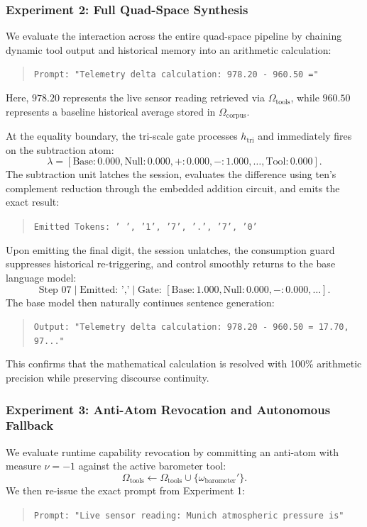 \documentclass[preprint,12pt]{elsarticle}
\begin{document}
\subsubsection{Experiment 2: Full Quad-Space Synthesis}
We evaluate the interaction across the entire quad-space pipeline by chaining dynamic tool output and historical memory into an arithmetic calculation:
\begin{quote}
\texttt{Prompt: "Telemetry delta calculation: 978.20 - 960.50 ="}
\end{quote}
Here, $978.20$ represents the live sensor reading retrieved via $\Omega_{\mathrm{tools}}$, while $960.50$ represents a baseline historical average stored in $\Omega_{\mathrm{corpus}}$.

At the equality boundary, the tri-scale gate processes $h_{\mathrm{tri}}$ and immediately fires on the subtraction atom:
\begin{equation}
\lambda = [\text{Base}: 0.000, \text{Null}: 0.000, +: 0.000, -: 1.000, \dots, \text{Tool}: 0.000].
\end{equation}
The subtraction unit latches the session, evaluates the difference using ten's complement reduction through the embedded addition circuit, and emits the exact result:
\begin{quote}
\texttt{Emitted Tokens: ' ', '1', '7', '.', '7', '0'}
\end{quote}
Upon emitting the final digit, the session unlatches, the consumption guard suppresses historical re-triggering, and control smoothly returns to the base language model:
\begin{equation}
\text{Step 07} \mid \text{Emitted: } \texttt{','} \mid \text{Gate: } [\text{Base}: 1.000, \text{Null}: 0.000, -: 0.000, \dots].
\end{equation}
The base model then naturally continues sentence generation:
\begin{quote}
\texttt{Output: "Telemetry delta calculation: 978.20 - 960.50 = 17.70, 97..."}
\end{quote}
This confirms that the mathematical calculation is resolved with 100\% arithmetic precision while preserving discourse continuity.

\subsubsection{Experiment 3: Anti-Atom Revocation and Autonomous Fallback}
We evaluate runtime capability revocation by committing an anti-atom with measure $\nu = -1$ against the active barometer tool:
\begin{equation}
\Omega_{\mathrm{tools}} \leftarrow \Omega_{\mathrm{tools}} \cup \{\omega_{\mathrm{barometer}}'\}.
\end{equation}
We then re-issue the exact prompt from Experiment 1:
\begin{quote}
\texttt{Prompt: "Live sensor reading: Munich atmospheric pressure is"}
\end{quote}
\end{document}
